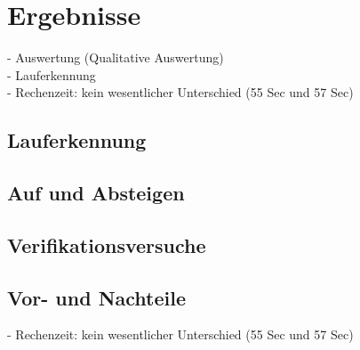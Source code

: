 \chapter{Ergebnisse}


- Auswertung (Qualitative Auswertung)\\
- Lauferkennung \\
- Rechenzeit: kein wesentlicher Unterschied (55 Sec und 57 Sec)


\section{Lauferkennung}





\section{Auf und Absteigen}




\section{Verifikationsversuche}



\section{Vor- und Nachteile}
- Rechenzeit: kein wesentlicher Unterschied (55 Sec und 57 Sec)





 